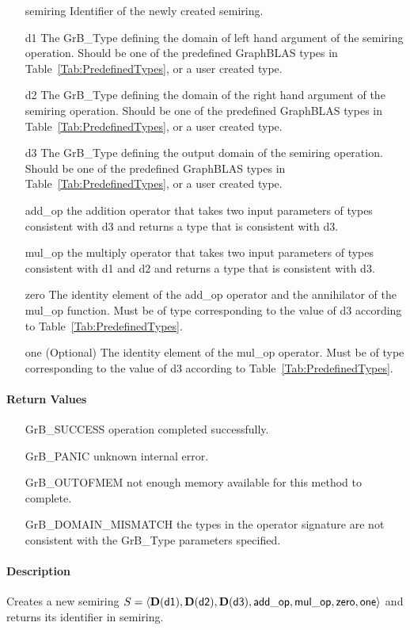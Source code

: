 \begin{itemize}[leftmargin=1.1in]
    \item[{\sf semiring}]       Identifier of the newly created semiring.
    \item[{\sf d1}]     The {\sf GrB\_Type} defining the domain of left hand argument of
    the semiring operation. Should be one of the predefined
    GraphBLAS types in Table~\ref{Tab:PredefinedTypes}, or a user created type.
    \item[{\sf d2}]     The {\sf GrB\_Type} defining the domain of the right hand 
    argument of the semiring operation. Should be one of the predefined
    GraphBLAS types in Table~\ref{Tab:PredefinedTypes}, or a user created type.
    \item[{\sf d3}]      The {\sf GrB\_Type} defining the output domain of the semiring
    operation. Should be one of the predefined
    GraphBLAS types in Table~\ref{Tab:PredefinedTypes}, or a user created type.
    \item[{\sf add\_op}]        the addition operator that takes two input parameters
    of types consistent with {\sf d3} and returns a type that is consistent with {\sf d3}.
    \item[{\sf mul\_op}]        the multiply operator that takes two input parameters
    of types consistent with {\sf d1} and {\sf d2} and returns a type that is consistent with {\sf d3}.
    \item[{\sf zero}]           The identity element of the {\sf add\_op} operator and the
    annihilator of the {\sf mul\_op} function.   Must be of type corresponding to the
    value of {\sf d3} according to Table~\ref{Tab:PredefinedTypes}.
    \item[{\sf one}]            (Optional) The identity element of the {\sf mul\_op} operator. 
    Must be of type corresponding to the value of {\sf d3} according to
    Table~\ref{Tab:PredefinedTypes}.
\end{itemize}


\paragraph{Return Values}

\begin{itemize}[leftmargin=2.1in]
\item[{\sf GrB\_SUCCESS}]           operation completed successfully.
\item[{\sf GrB\_PANIC}]             unknown internal error.
\item[{\sf GrB\_OUTOFMEM}]          not enough memory available for this method to complete.
\item[{\sf GrB\_DOMAIN\_MISMATCH}]  the types in the operator signature are not   
                                    consistent with the {\sf GrB\_Type} parameters specified.
\end{itemize}

\paragraph{Description}

Creates a new semiring $S = \langle \bold{D}({\sf d1}), \bold{D}({\sf d2}), 
\bold{D}({\sf d3}), {\sf add\_op}, {\sf mul\_op}, {\sf zero}, {\sf one} \rangle$ and 
returns its identifier in {\sf semiring}.

